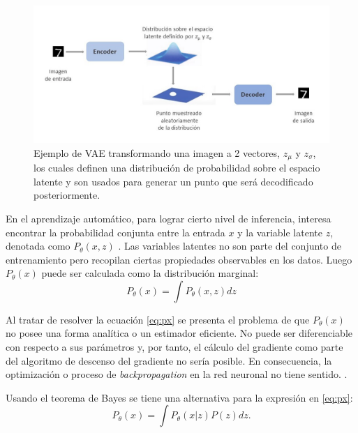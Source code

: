 \begin{figure}[!h]
	\centering
	
	\includegraphics[width=5in]{Graphics/VAEMnist.JPG}
	
	\caption{ \small{Ejemplo de VAE transformando una imagen a 2 vectores, $z_{\mu}$ y $z_{\sigma}$, los cuales definen  una distribución de probabilidad sobre el espacio latente y son usados para generar un punto que será decodificado posteriormente.}}
	
	\label{VAEminist}
	
\end{figure}

En el aprendizaje automático, para lograr cierto nivel de inferencia, interesa encontrar la probabilidad conjunta entre la entrada $x$ y la variable latente $z$, denotada como $P_{\theta}(x, z)$ \cite{Advanced}. Las variables latentes no son parte del conjunto de entrenamiento pero recopilan ciertas propiedades observables en los datos. Luego $P_{\theta}(x)$ puede ser calculada como la distribución marginal: 
\begin{equation}
	P_{\theta}(x) = \int P_{\theta}(x, z)dz
	\label{eq:px}
\end{equation}

Al tratar de resolver la ecuación \ref{eq:px} se presenta el problema de que $P_{\theta}(x)$ no posee una forma analítica o un estimador eficiente. No puede ser diferenciable con respecto a sus parámetros \cite{Advanced} y, por tanto, el cálculo del gradiente como parte del algoritmo de descenso del gradiente no sería posible. En consecuencia, la optimización o proceso de \textit{backpropagation} en la red neuronal no tiene sentido. \cite{Chollet}.

Usando el teorema de Bayes se tiene una alternativa para la expresión en \ref{eq:px}:
\begin{equation}
	P_{\theta}(x) = \int P_{\theta}(x|z)P(z)dz.
	\label{eq:pxBayes}
\end{equation}

